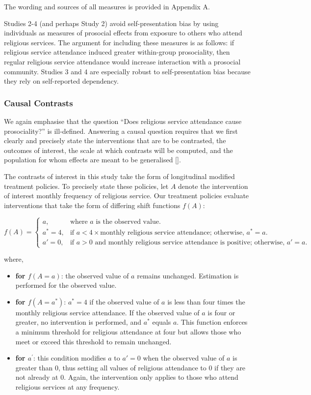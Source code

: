 \documentclass[
  single column]{article}
\begin{document}
The wording and sources of all measures is provided in Appendix A.

Studies 2-4 (and perhaps Study 2) avoid self-presentation bias by using
individuals as measures of prosocial effects from exposure to others who
attend religious services. The argument for including these measures is
as follows: if religious service attendance induced greater within-group
prosociality, then regular religious service attendance would increase
interaction with a prosocial community. Studies 3 and 4 are especially
robust to self-presentation bias because they rely on self-reported
dependency.

\subsubsection{Causal Contrasts}\label{causal-contrasts}

We again emphasise that the question ``Does religious service attendance
cause prosociality?'' is ill-defined. Answering a causal question
requires that we first clearly and precisely state the interventions
that are to be contrasted, the outcomes of interest, the scale at which
contrasts will be computed, and the population for whom effects are
meant to be generalised {[}{]}.

The contrasts of interest in this study take the form of longitudinal
modified treatment policies. To precisely state these policies, let
\(A\) denote the intervention of interest monthly frequency of religious
service. Our treatment policies evaluate interventions that take the
form of differing shift functions \(f(A)\):

\[
f(A) = 
\begin{cases} 
a, & \text{where } a \text{ is the observed value.}\\
a^* = 4, & \text{if } a < 4 \times \text{monthly religious service attendance; otherwise, } a^* = a.\\
a' = 0, & \text{if } a > 0 \text{ and monthly religious service attendance is positive; otherwise, } a' = a. 
\end{cases}
\]

where,

\begin{itemize}
\item
  \textbf{for \(f(A=a)\)}: the observed value of \(a\) remains
  unchanged. Estimation is performed for the observed value.
\item
  \textbf{for \(f(A =a^*)\)}: \(a^* = 4\) if the observed value of \(a\)
  is less than four times the monthly religious service attendance. If
  the observed value of \(a\) is four or greater, no intervention is
  performed, and \(a^*\) equals \(a\). This function enforces a minimum
  threshold for religious attendance at four but allows those who meet
  or exceed this threshold to remain unchanged.
\item
  \textbf{for \(a^\prime\)}: this condition modifies \(a\) to \(a' = 0\)
  when the observed value of \(a\) is greater than 0, thus setting all
  values of religious attendance to 0 if they are not already at 0.
  Again, the intervention only applies to those who attend religious
  services at any frequency.
\end{itemize}
\end{document}
